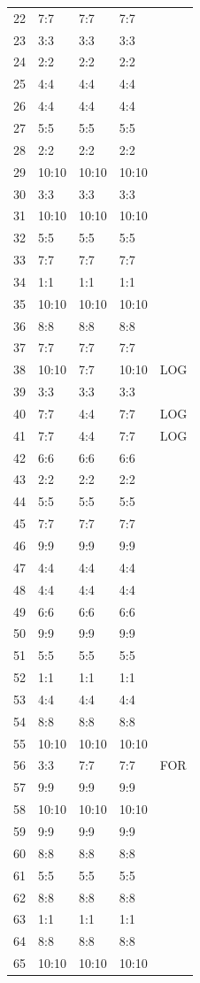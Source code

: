 \documentclass{report}
\begin{document}
\begin{center}
\begin{longtable}{|l|l|l|l|l|}
22&7:7&7:7&7:7&\\
23&3:3&3:3&3:3&\\
24&2:2&2:2&2:2&\\
25&4:4&4:4&4:4&\\
26&4:4&4:4&4:4&\\
27&5:5&5:5&5:5&\\
28&2:2&2:2&2:2&\\
29&10:10&10:10&10:10&\\
30&3:3&3:3&3:3&\\
31&10:10&10:10&10:10&\\
32&5:5&5:5&5:5&\\
33&7:7&7:7&7:7&\\
34&1:1&1:1&1:1&\\
35&10:10&10:10&10:10&\\
36&8:8&8:8&8:8&\\
37&7:7&7:7&7:7&\\
38&10:10&7:7&10:10&LOG\\
39&3:3&3:3&3:3&\\
40&7:7&4:4&7:7&LOG\\
41&7:7&4:4&7:7&LOG\\
42&6:6&6:6&6:6&\\
43&2:2&2:2&2:2&\\
44&5:5&5:5&5:5&\\
45&7:7&7:7&7:7&\\
46&9:9&9:9&9:9&\\
47&4:4&4:4&4:4&\\
48&4:4&4:4&4:4&\\
49&6:6&6:6&6:6&\\
50&9:9&9:9&9:9&\\
51&5:5&5:5&5:5&\\
52&1:1&1:1&1:1&\\
53&4:4&4:4&4:4&\\
54&8:8&8:8&8:8&\\
55&10:10&10:10&10:10&\\
56&3:3&7:7&7:7&FOR\\
57&9:9&9:9&9:9&\\
58&10:10&10:10&10:10&\\
59&9:9&9:9&9:9&\\
60&8:8&8:8&8:8&\\
61&5:5&5:5&5:5&\\
62&8:8&8:8&8:8&\\
63&1:1&1:1&1:1&\\
64&8:8&8:8&8:8&\\
65&10:10&10:10&10:10&\\

\end{longtable}
\end{center}
\end{document}
